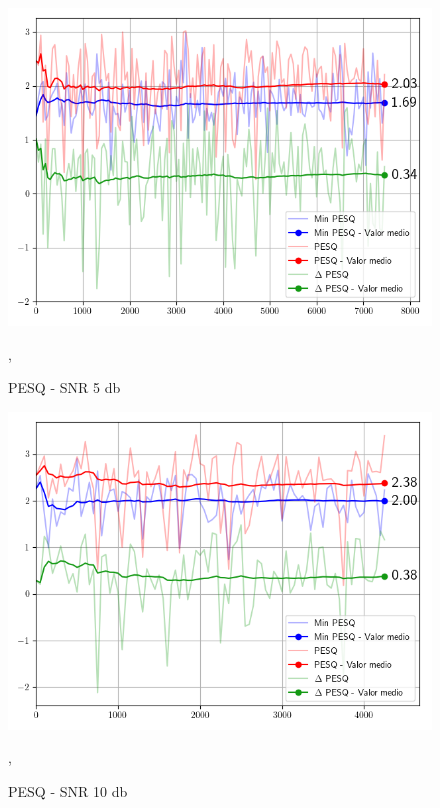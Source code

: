 \begin{figure}
	\centering
	\centerline{\includegraphics[scale=0.70]{images/ch7/objective_metrics/metric_PESQ_5db.png}}
	\caption{PESQ - SNR 5 db}
	\label{fig:ch7_pesq_five_db},
\end{figure}

\begin{figure}
	\centering
	\centerline{\includegraphics[scale=0.70]{images/ch7/objective_metrics/metric_PESQ_10db.png}}
	\caption{PESQ - SNR 10 db}
	\label{fig:ch7_pesq_ten_db},
\end{figure}

